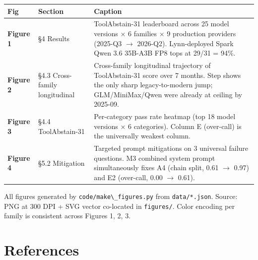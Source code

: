 \documentclass[11pt]{article}
\providecommand{\passthrough}[1]{#1}
\newcounter{none}
\begin{document}
{\def\LTcaptype{none} %
\begin{longtable}[]{@{}
  >{\raggedright\arraybackslash}p{}
  >{\raggedright\arraybackslash}p{}
  >{\raggedright\arraybackslash}p{}@{}}
\toprule\noalign{}
\begin{minipage}[b]{\linewidth}\raggedright
Fig
\end{minipage} & \begin{minipage}[b]{\linewidth}\raggedright
Section
\end{minipage} & \begin{minipage}[b]{\linewidth}\raggedright
Caption
\end{minipage} \\
\midrule\noalign{}
\endhead
\bottomrule\noalign{}
\endlastfoot
\textbf{Figure 1} & §4 Results & ToolAbstain-31 leaderboard across 25
model versions $\times$ 6 families $\times$ 9 production providers (2025-Q3 $\rightarrow$
2026-Q2). Lynn-deployed Spark Qwen 3.6 35B-A3B FP8 tops at 29/31 =
94\%. \\
\textbf{Figure 2} & §4.3 Cross-family longitudinal & Cross-family
longitudinal trajectory of ToolAbstain-31 score over 7 months. Step
shows the only sharp legacy-to-modern jump; GLM/MiniMax/Qwen were
already at ceiling by 2025-09. \\
\textbf{Figure 3} & §4.4 ToolAbstain-31 & Per-category pass rate heatmap
(top 18 model versions $\times$ 6 categories). Column E (over-call) is the
universally weakest column. \\
\textbf{Figure 4} & §5.2 Mitigation & Targeted prompt mitigations on 3
universal failure questions. M3 combined system prompt simultaneously
fixes A4 (chain split, 0.61 $\rightarrow$ 0.97) and E2 (over-call, 0.00 $\rightarrow$ 0.61). \\
\end{longtable}
}

All figures generated by \passthrough{\lstinline!code/make\_figures.py!}
from \passthrough{\lstinline!data/*.json!}. Source: PNG at 300 DPI + SVG
vector co-located in \passthrough{\lstinline!figures/!}. Color encoding
per family is consistent across Figures 1, 2, 3.



\section*{References}\label{sec:references}
\end{document}
